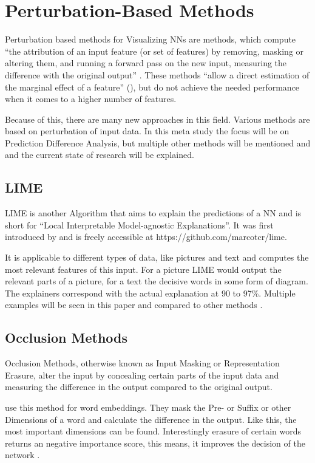 \section{Perturbation-Based Methods}
Perturbation based methods for Visualizing NNs are methods, which compute “the attribution of an input feature (or set of features) by removing, masking or altering them, and running a forward pass on the new input, measuring the difference with the original output” \cite[2]{Acona.2018}.
These methods “allow a direct estimation of the marginal effect of a feature” (\cite[p.2]{Acona.2018}), but do not achieve the needed performance when it comes to a higher number of features.
\par
Because of this, there are many new approaches in this field.
Various methods are based on perturbation of input data. In this meta study the focus will be on Prediction Difference Analysis, but multiple other methods will be mentioned and and the current state of research will be explained.


\subsection{LIME}
LIME is another Algorithm that aims to explain the predictions of a NN and is short for “Local Interpretable Model-agnostic Explanations”. It was first introduced by  and is freely accessible at https://github.com/marcotcr/lime.
\par
It is applicable to different types of data, like pictures and text and computes the most relevant features of this input. For a picture LIME would output the relevant parts of a picture, for a text the decisive words in some form of diagram. The explainers correspond with the actual explanation at 90 to 97\%. Multiple examples will be seen in this paper and compared to other methods \cite{Ribeiro.2016}.

\subsection{Occlusion Methods}
Occlusion Methods, otherwise known as Input Masking or Representation Erasure, alter the input by concealing certain parts of the input data and measuring the difference in the output compared to the original output. 
\par
{} use this method for word embeddings. They mask the Pre- or Suffix or other Dimensions of a word and calculate the difference in the output. Like this, the most important dimensions can be found. Interestingly erasure of certain words returns an negative importance score, this means, it improves the decision of the network \cite{Li.2016}.

